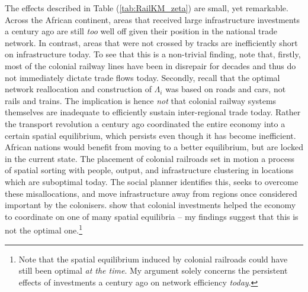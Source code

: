 \documentclass[11pt, oneside]{article}   	%
\let\oldref\ref
\renewcommand{\ref}[1]{(\oldref{#1})}
\begin{document}
The effects described in Table \ref{tab:RailKM_zeta} are small, yet remarkable. Across the African continent, areas that received large infrastructure investments a century ago are still \emph{too} well off given their position in the national trade network. In contrast, areas that were not crossed by tracks are inefficiently short on infrastructure today. To see that this is a non-trivial finding, note that, firstly, most of the colonial railway lines have been in disrepair for decades and thus do not immediately dictate trade flows today. Secondly, recall that the optimal network reallocation and construction of $\Lambda_{i}$ was based on roads and cars, not rails and trains. The implication is hence \emph{not} that colonial railway systems themselves are inadequate to efficiently sustain inter-regional trade today. Rather the transport revolution a century ago coordinated the entire economy into a certain spatial equilibrium, which persists even though it has become inefficient. African nations would benefit from moving to a better equilibrium, but are locked in the current state. The placement of colonial railroads set in motion a process of spatial sorting with people, output, and infrastructure clustering in locations which are suboptimal today. The social planner identifies this, seeks to overcome these misallocations, and move infrastructure away from regions once considered important by the colonisers. \citeauthor{Jedwab_PermanentEffectsTransportation_2016a} show that colonial investments helped the economy to coordinate on one of many spatial equilibria -- my findings suggest that this is not the optimal one.\footnote{Note that the spatial equilibrium induced by colonial railroads could have still been optimal \emph{at the time}. My argument solely concerns the persistent effects of investments a century ago on network efficiency \emph{today}.}
\end{document}
